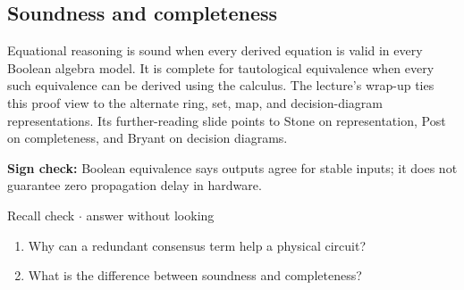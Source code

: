 \documentclass[11pt]{article}
\begin{document}
\begin{keepsection}
\begin{keepsection}
\subsection{Soundness and completeness}

Equational reasoning is sound when every derived equation is valid in every Boolean algebra model. It is complete for tautological equivalence when every such equivalence can be derived using the calculus. The lecture’s wrap-up ties this proof view to the alternate ring, set, map, and decision-diagram representations. Its further-reading slide points to Stone on representation, Post on completeness, and Bryant on decision diagrams.

\begin{notebox}\textbf{Sign check:} Boolean equivalence says outputs agree for stable inputs; it does not guarantee zero propagation delay in hardware.\end{notebox}

\begin{recallbox}{Recall check \ensuremath{\cdot} answer without looking}
\begin{enumerate}
\item Why can a redundant consensus term help a physical circuit?
\item What is the difference between soundness and completeness?
\end{enumerate}

\end{recallbox}
\end{keepsection}
\end{keepsection}
\end{document}
